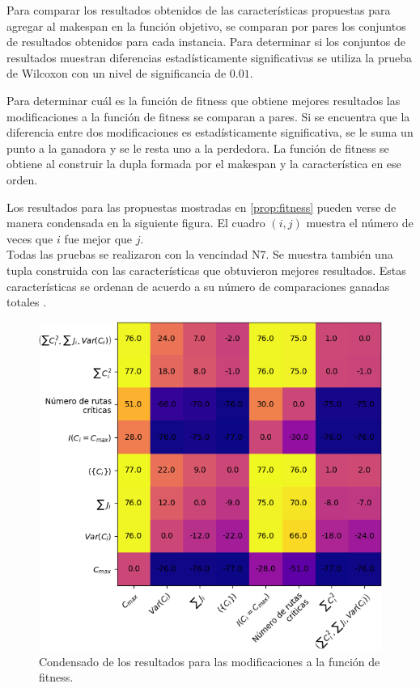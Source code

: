 Para comparar los resultados obtenidos de las características propuestas para agregar al makespan en la función objetivo, se comparan por pares los conjuntos de resultados obtenidos para cada instancia. Para determinar si los conjuntos de resultados muestran diferencias estadísticamente significativas se utiliza la prueba de Wilcoxon con un nivel de significancia de $0.01$. 

Para determinar cuál es la función de fitness que obtiene mejores resultados las modificaciones a la función de fitness se comparan a pares. Si se encuentra que la diferencia entre dos modificaciones es estadísticamente significativa, se le suma un punto a la ganadora y se le resta uno a la perdedora. La función de fitness se obtiene al construir la dupla formada por el makespan y la característica en ese orden.

Los resultados para las propuestas mostradas en \ref{prop:fitness} pueden verse de manera condensada en la siguiente figura. El cuadro $(i,j)$ muestra el número de veces que $i$ fue mejor que $j$.\\
Todas las pruebas se realizaron con la vencindad N7. Se muestra también una tupla construida con las características que obtuvieron mejores resultados. Estas características se ordenan de acuerdo a su número de comparaciones ganadas totales .
\begin{figure}[H]
    \centering
    \includegraphics[scale=.8]{Imagenes/fitnesscomp.png}
    \caption{Condensado de los resultados para las modificaciones a la función de fitness. }
\end{figure}

